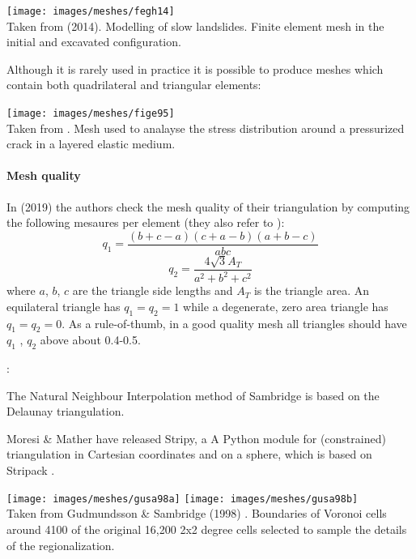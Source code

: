 \begin{center}
\texttt{[image: images/meshes/fegh14]}\\
{\captionfont Taken from \textcite{fegh14} (2014). Modelling of slow
landslides. Finite element mesh in the initial and excavated configuration.}
\end{center}

Although it is rarely used in practice it is possible to produce meshes which contain 
both quadrilateral and triangular elements:
\begin{center}
\texttt{[image: images/meshes/fige95]}\\
{\captionfont Taken from \textcite{fige95}. 
Mesh used to analayse the stress distribution around a pressurized crack in a layered 
elastic medium.}
\end{center}


\paragraph{Mesh quality} 
In \textcite{cibo19} (2019) the authors check the mesh quality of their triangulation
by computing the following mesaures per element 
(they also refer to \textcite{fiel00}):
\[
q_1 = \frac{(b+c-a)(c+a-b)(a+b-c)}{abc}
\]
\[
q_2 = \frac{4\sqrt{3} A_T}{a^2+b^2+c^2}
\]
where $a$, $b$, $c$ are the triangle side lengths and $A_T$ is the triangle area. 
An equilateral triangle has $q_1 = q_2 = 1$ while a
degenerate, zero area triangle has $q_1 = q_2 = 0$. 
As a rule-of-thumb, in a good quality mesh all triangles should have $q_1$ , $q_2$
above about 0.4-0.5.

\vspace{1cm}

\Literature: 

\begin{remark} 
The Natural Neighbour Interpolation method of Sambridge \etal \cite{sabm95,sabm96} 
is based on the Delaunay triangulation.
\end{remark}

\begin{remark} 
Moresi \& Mather \cite{moma19} have released Stripy, a A Python module for (constrained) triangulation
in Cartesian coordinates and on a sphere, which is based on Stripack \cite{renk96,renk97}.
\end{remark}


\begin{center}
\texttt{[image: images/meshes/gusa98a]}
\texttt{[image: images/meshes/gusa98b]}\\
{\captionfont Taken from Gudmundsson \& Sambridge (1998) \cite{gusa98}.
Boundaries of Voronoi cells around 4100 of the original 16,200 2x2 degree cells
selected to sample the details of the regionalization.}
\end{center}


